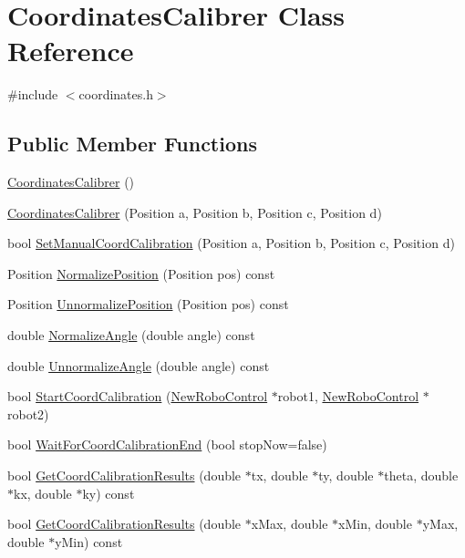 \hypertarget{classCoordinatesCalibrer}{
\section{CoordinatesCalibrer Class Reference}
\label{classCoordinatesCalibrer}
}


{\ttfamily \#include $<$coordinates.h$>$}

\subsection*{Public Member Functions}
\begin{DoxyCompactItemize}
\item 
\hyperlink{classCoordinatesCalibrer_ac9a522299ada8f2e58ed8f0c91f4f396}{CoordinatesCalibrer} ()
\item 
\hyperlink{classCoordinatesCalibrer_a3b6304945fa64ac97a1b0bbc78753155}{CoordinatesCalibrer} (Position a, Position b, Position c, Position d)
\item 
bool \hyperlink{classCoordinatesCalibrer_a006c18905b14e4780b9fc74fe26649fc}{SetManualCoordCalibration} (Position a, Position b, Position c, Position d)
\item 
Position \hyperlink{classCoordinatesCalibrer_ad6519b69842756c256922d14d1e248ce}{NormalizePosition} (Position pos) const 
\item 
Position \hyperlink{classCoordinatesCalibrer_a8522193b13196313d001c589e7845bd3}{UnnormalizePosition} (Position pos) const 
\item 
double \hyperlink{classCoordinatesCalibrer_acae6b5f07cf198f9c85a1b09e9a275dc}{NormalizeAngle} (double angle) const 
\item 
double \hyperlink{classCoordinatesCalibrer_ab97fd4d3f3930aaff39cee1543022cb6}{UnnormalizeAngle} (double angle) const 
\item 
bool \hyperlink{classCoordinatesCalibrer_a2087994adbb8651efcb06e3d7a2315da}{StartCoordCalibration} (\hyperlink{classNewRoboControl}{NewRoboControl} $\ast$robot1, \hyperlink{classNewRoboControl}{NewRoboControl} $\ast$robot2)
\item 
bool \hyperlink{classCoordinatesCalibrer_a99563ba6e43f839bf1b10f55cf155125}{WaitForCoordCalibrationEnd} (bool stopNow=false)
\item 
bool \hyperlink{classCoordinatesCalibrer_a92672252bda26bddd9b8c73bc6395ea3}{GetCoordCalibrationResults} (double $\ast$tx, double $\ast$ty, double $\ast$theta, double $\ast$kx, double $\ast$ky) const 
\item 
bool \hyperlink{classCoordinatesCalibrer_a1a3ae703556c2f4c4455792a43fed987}{GetCoordCalibrationResults} (double $\ast$xMax, double $\ast$xMin, double $\ast$yMax, double $\ast$yMin) const 
\end{DoxyCompactItemize}
